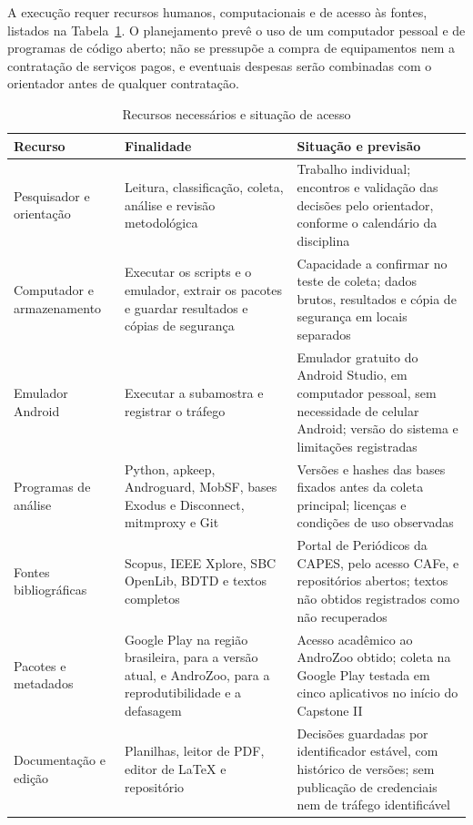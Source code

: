 A execução requer recursos humanos, computacionais e de acesso às fontes, listados na Tabela~\ref{tab:recursos}. O planejamento prevê o uso de um computador pessoal e de programas de código aberto; não se pressupõe a compra de equipamentos nem a contratação de serviços pagos, e eventuais despesas serão combinadas com o orientador antes de qualquer contratação.

\begin{table}[htbp]
\centering
\small
\caption{Recursos necessários e situação de acesso}\label{tab:recursos}
\begin{tabularx}{\textwidth}{|>{\raggedright\arraybackslash}p{2.8cm}|>{\raggedright\arraybackslash}X|>{\raggedright\arraybackslash}X|}
\hline
\textbf{Recurso} & \textbf{Finalidade} & \textbf{Situação e previsão} \\ \hline
Pesquisador e orientação & Leitura, classificação, coleta, análise e revisão metodológica & Trabalho individual; encontros e validação das decisões pelo orientador, conforme o calendário da disciplina \\ \hline
Computador e armazenamento & Executar os scripts e o emulador, extrair os pacotes e guardar resultados e cópias de segurança & Capacidade a confirmar no teste de coleta; dados brutos, resultados e cópia de segurança em locais separados \\ \hline
Emulador Android & Executar a subamostra e registrar o tráfego & Emulador gratuito do Android Studio, em computador pessoal, sem necessidade de celular Android; versão do sistema e limitações registradas \\ \hline
Programas de análise & Python, apkeep, Androguard, MobSF, bases Exodus e Disconnect, mitmproxy e Git & Versões e hashes das bases fixados antes da coleta principal; licenças e condições de uso observadas \\ \hline
Fontes bibliográficas & Scopus, IEEE Xplore, SBC OpenLib, BDTD e textos completos & Portal de Periódicos da CAPES, pelo acesso CAFe, e repositórios abertos; textos não obtidos registrados como não recuperados \\ \hline
Pacotes e metadados & Google Play na região brasileira, para a versão atual, e AndroZoo, para a reprodutibilidade e a defasagem & Acesso acadêmico ao AndroZoo obtido; coleta na Google Play testada em cinco aplicativos no início do Capstone II \\ \hline
Documentação e edição & Planilhas, leitor de PDF, editor de LaTeX e repositório & Decisões guardadas por identificador estável, com histórico de versões; sem publicação de credenciais nem de tráfego identificável \\ \hline
\end{tabularx}
\end{table}

